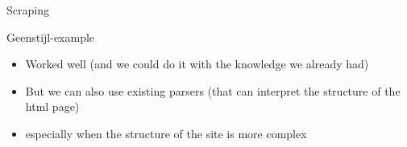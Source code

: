 \documentclass{beamer}
\begin{document}
\begin{frame}{Scraping}
\begin{block}{Geenstijl-example}
\begin{itemize}
\item<1->Worked well (and we could do it with the knowledge we already had)
\item<2->But we can also use existing parsers (that can interpret the structure of the html page)
\item<3->especially when the structure of the site is more complex 
\end{itemize}
\end{block}
\end{frame}

{
	\begin{frame}[plain]
\end{frame}
}

{
	\begin{frame}[plain]
\end{frame}
}

{
	\begin{frame}[plain]
\end{frame}
}

{
	\begin{frame}[plain]
\end{frame}
}
\end{document}
